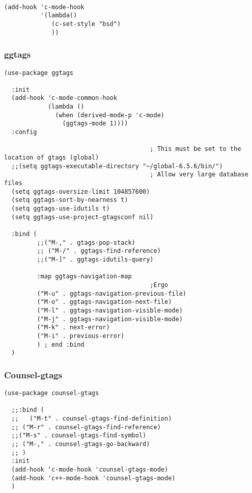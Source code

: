 \documentclass[12pt]{article}
\begin{document}
\begin{verbatim}

(add-hook 'c-mode-hook
          '(lambda()
             (c-set-style "bsd")
             ))
\end{verbatim}


\subsubsection{ggtags}
\label{sec:orgadc1108}


\begin{verbatim}
(use-package ggtags

  :init
  (add-hook 'c-mode-common-hook
            (lambda ()
              (when (derived-mode-p 'c-mode)
                (ggtags-mode 1))))
  :config

                                        ; This must be set to the location of gtags (global)
  ;;(setq ggtags-executable-directory "~/global-6.5.6/bin/")
                                        ; Allow very large database files
  (setq ggtags-oversize-limit 104857600)
  (setq ggtags-sort-by-nearness t)
  (setq ggtags-use-idutils t)
  (setq ggtags-use-project-gtagsconf nil)

  :bind (
         ;;("M-," . gtags-pop-stack)
         ;; ("M-/" . ggtags-find-reference)
         ;;("M-]" . ggtags-idutils-query)

         :map ggtags-navigation-map
                                        ;Ergo
         ("M-u" . ggtags-navigation-previous-file)
         ("M-o" . ggtags-navigation-next-file)
         ("M-l" . ggtags-navigation-visible-mode)
         ("M-j" . ggtags-navigation-visible-mode)
         ("M-k" . next-error)
         ("M-i" . previous-error)
         ) ; end :bind
  )

\end{verbatim}

\subsubsection{Counsel-gtags}
\label{sec:org339fee4}

\begin{verbatim}
(use-package counsel-gtags

  ;;:bind (
  ;;   ("M-t" . counsel-gtags-find-definition)
  ;; ("M-r" . counsel-gtags-find-reference)
  ;;("M-s" . counsel-gtags-find-symbol)
  ;; ("M-," . counsel-gtags-go-backward)
  ;; )
  :init
  (add-hook 'c-mode-hook 'counsel-gtags-mode)
  (add-hook 'c++-mode-hook 'counsel-gtags-mode)
  )

\end{verbatim}
\end{document}
